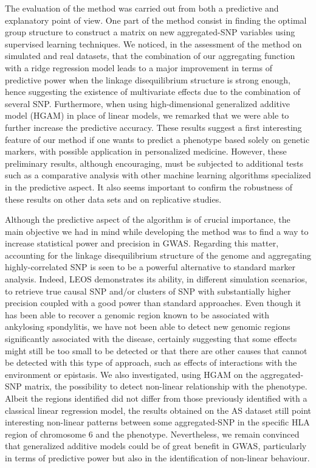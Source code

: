\documentclass[]{book}
\begin{document}
The evaluation of the method was carried out from both a predictive and
explanatory point of view. One part of the method consist in finding the
optimal group structure to construct a matrix on new aggregated-SNP
variables using supervised learning techniques. We noticed, in the
assessment of the method on simulated and real datasets, that the
combination of our aggregating function with a ridge regression model
leads to a major improvement in terms of predictive power when the
linkage disequilibrium structure is strong enough, hence suggesting the
existence of multivariate effects due to the combination of several SNP.
Furthermore, when using high-dimensional generalized additive model
(HGAM) in place of linear models, we remarked that we were able to
further increase the predictive accuracy. These results suggest a first
interesting feature of our method if one wants to predict a phenotype
based solely on genetic markers, with possible application in
personalized medicine. However, these preliminary results, although
encouraging, must be subjected to additional tests such as a comparative
analysis with other machine learning algorithms specialized in the
predictive aspect. It also seems important to confirm the robustness of
these results on other data sets and on replicative studies.

Although the predictive aspect of the algorithm is of crucial
importance, the main objective we had in mind while developing the
method was to find a way to increase statistical power and precision in
GWAS. Regarding this matter, accounting for the linkage disequilibrium
structure of the genome and aggregating highly-correlated SNP is seen to
be a powerful alternative to standard marker analysis. Indeed, LEOS
demonstrates its ability, in different simulation scenarios, to retrieve
true causal SNP and/or clusters of SNP with substantially higher
precision coupled with a good power than standard approaches. Even
though it has been able to recover a genomic region known to be
associated with ankylosing spondylitis, we have not been able to detect
new genomic regions significantly associated with the disease, certainly
suggesting that some effects might still be too small to be detected or
that there are other causes that cannot be detected with this type of
approach, such as effects of interactions with the environment or
epistasis. We also investigated, using HGAM on the aggregated-SNP
matrix, the possibility to detect non-linear relationship with the
phenotype. Albeit the regions identified did not differ from those
previously identified with a classical linear regression model, the
results obtained on the AS dataset still point interesting non-linear
patterns between some aggregated-SNP in the specific HLA region of
chromosome 6 and the phenotype. Nevertheless, we remain convinced that
generalized additive models could be of great benefit in GWAS,
particularly in terms of predictive power but also in the identification
of non-linear behaviour.
\end{document}
